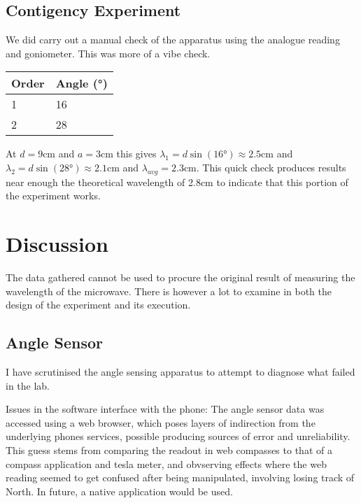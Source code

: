 \subsection*{Contigency Experiment}

We did carry out a manual check of the apparatus using the analogue reading and goniometer.
This was more of a vibe check. 

\begin{table}[h]
\begin{tabular}{|ll|}
\hline
 Order & Angle (°)   \\
\hline
 1  & 16   \\
 2  & 28   \\
\hline
\end{tabular}
\end{table}

At $d = 9$cm and $a = 3$cm this gives $\lambda_1 = d \sin{(16°)} \approx 2.5$cm and $\lambda_2 = d \sin{(28°)} \approx 2.1$cm and $\lambda_{avg} = 2.3$cm. 
This quick check produces results near enough the theoretical wavelength of 2.8cm to indicate that this portion of the experiment works.

\section*{Discussion}

The data gathered cannot be used to procure the original result of measuring the wavelength of the microwave. There is however a lot to examine in both the design of the experiment and its execution.

\subsection*{Angle Sensor}

I have scrutinised the angle sensing apparatus to attempt to diagnose what failed in the lab.

Issues in the software interface with the phone:
The angle sensor data was accessed using a web browser, which poses layers of indirection from the underlying phones services, possible producing sources of error and unreliability. This guess stems from comparing the readout in web compasses to that of a compass application and tesla meter, and obvserving effects where the web reading seemed to get confused after being manipulated, involving losing track of North. In future, a native application would be used.


